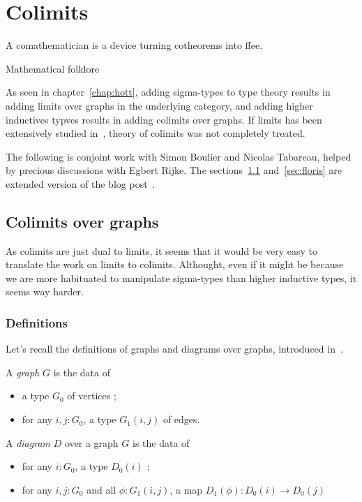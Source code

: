 \chapter{Colimits}
\label{chap:colim}

\epigraph{A comathematician is a device turning cotheorems into
  ffee.}{Mathematical folklore}

As seen in chapter~\ref{chap:hott}, adding sigma-types to type theory
results in adding limits over graphs in the underlying category, and
adding higher inductives typves results in adding colimits over
graphs. If limits has been extensively studied in~\cite{lumsdaine},
theory of colimits was not completely treated.

The following is conjoint work with Simon Boulier and Nicolas
Tabareau, helped by precious discussions with Egbert Rijke.
The sections~\ref{sec:colim} and~\ref{sec:floris} are extended version
of the blog post~\cite{boulier}.

\section{Colimits over graphs}
\label{sec:colim}

As colimits are just dual to limits, it seems that it would be very
easy to translate the work on limits to colimits. Althought, even if
it might be because we are more habituated to manipulate sigma-types
than higher inductive types, it seems way harder.

\subsection{Definitions}
\label{ssec:colim:defi}

Let's recall the definitions of graphs and diagrams over graphs,
introduced in~\cite{lumsdaine}.

\begin{defi}[Graph]\label{defi:graph}
  A {\em graph} $G$ is the data of
  \begin{itemize}
  \item a type $G_0$ of vertices ;
  \item for any $i,j:G_0$, a type $G_1(i,j)$ of edges.
  \end{itemize}
\end{defi}

\begin{defi}[Diagram]\label{defi:diagram}
  A {\em diagram} $D$ over a graph $G$ is the data of
  \begin{itemize}
  \item for any $i:G_0$, a type $D_0(i)$ ;
  \item for any $i,j:G_0$ and all $\phi : G_1(i,j)$, a map $D_1(\phi)
    : D_0(i) \to D_0(j)$
  \end{itemize}
\end{defi}

